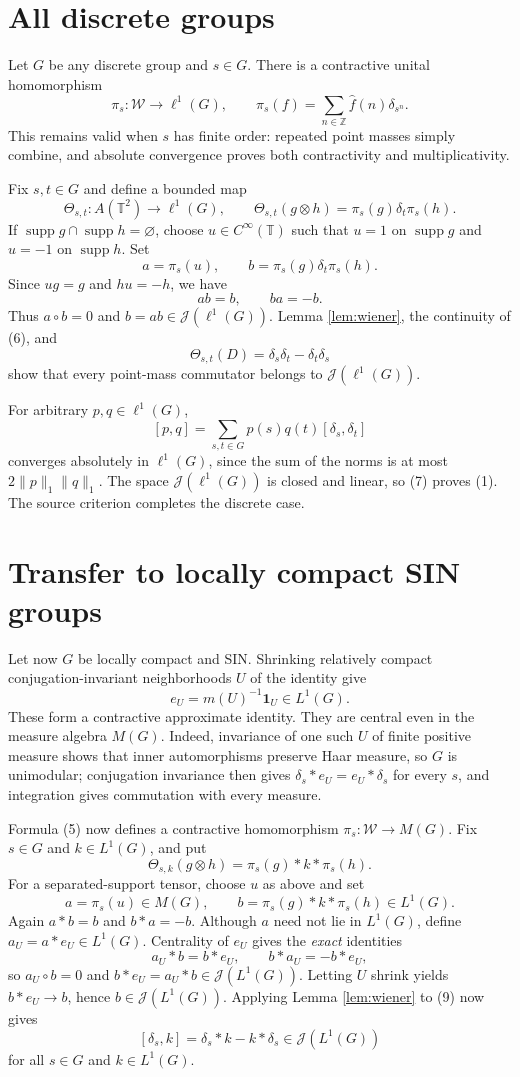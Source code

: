 \documentclass[10pt]{article}
\newcommand{\TT}{\mathbb T}
\newcommand{\W}{\mathcal W}
\newcommand{\JJ}{\mathcal J}
\newcommand{\supp}{\operatorname{supp}}
\begin{document}
\section*{All discrete groups}

Let $G$ be any discrete group and $s\in G$.  There is a contractive unital
homomorphism
\[
 \pi_s:\W\longrightarrow\ell^1(G),\qquad
 \pi_s(f)=\sum_{n\in\mathbb Z}\widehat f(n)\delta_{s^n}.   \tag{5}
\]
This remains valid when $s$ has finite order: repeated point masses simply
combine, and absolute convergence proves both contractivity and
multiplicativity.

Fix $s,t\in G$ and define a bounded map
\[
 \Theta_{s,t}:A(\TT^2)\longrightarrow\ell^1(G),\qquad
 \Theta_{s,t}(g\otimes h)=\pi_s(g)\delta_t\pi_s(h).         \tag{6}
\]
If $\supp g\cap\supp h=\varnothing$, choose $u\in C^\infty(\TT)$ such that
$u=1$ on $\supp g$ and $u=-1$ on $\supp h$.  Set
\[
 a=\pi_s(u),\qquad b=\pi_s(g)\delta_t\pi_s(h).
\]
Since $ug=g$ and $hu=-h$, we have
\[
 ab=b,\qquad ba=-b.
\]
Thus $a\circ b=0$ and $b=ab\in\JJ(\ell^1(G))$.  Lemma
\ref{lem:wiener}, the continuity of (6), and
\[
 \Theta_{s,t}(D)=\delta_s\delta_t-\delta_t\delta_s
\]
show that every point-mass commutator belongs to $\JJ(\ell^1(G))$.

For arbitrary $p,q\in\ell^1(G)$,
\[
 [p,q]=\sum_{s,t\in G}p(s)q(t)[\delta_s,\delta_t]          \tag{7}
\]
converges absolutely in $\ell^1(G)$, since the sum of the norms is at most
$2\|p\|_1\|q\|_1$.  The space $\JJ(\ell^1(G))$ is closed and linear, so
(7) proves (1).  The source criterion completes the discrete case.

\section*{Transfer to locally compact SIN groups}

Let now $G$ be locally compact and SIN.  Shrinking relatively compact
conjugation-invariant neighborhoods $U$ of the identity give
\[
 e_U=m(U)^{-1}\mathbf1_U\in L^1(G).                         \tag{8}
\]
These form a contractive approximate identity.  They are central even in the
measure algebra $M(G)$.  Indeed, invariance of one such $U$ of finite positive
measure shows that inner automorphisms preserve Haar measure, so $G$ is
unimodular; conjugation invariance then gives
$\delta_s*e_U=e_U*\delta_s$ for every $s$, and integration gives commutation
with every measure.

Formula (5) now defines a contractive homomorphism $\pi_s:\W\to M(G)$.
Fix $s\in G$ and $k\in L^1(G)$, and put
\[
 \Theta_{s,k}(g\otimes h)=\pi_s(g)*k*\pi_s(h).             \tag{9}
\]
For a separated-support tensor, choose $u$ as above and set
\[
 a=\pi_s(u)\in M(G),\qquad b=\pi_s(g)*k*\pi_s(h)\in L^1(G).
\]
Again $a*b=b$ and $b*a=-b$.  Although $a$ need not lie in $L^1(G)$, define
$a_U=a*e_U\in L^1(G)$.  Centrality of $e_U$ gives the \emph{exact} identities
\[
 a_U*b=b*e_U,\qquad b*a_U=-b*e_U,
\]
so $a_U\circ b=0$ and $b*e_U=a_U*b\in\JJ(L^1(G))$.  Letting
$U$ shrink yields $b*e_U\to b$, hence $b\in\JJ(L^1(G))$.
Applying Lemma \ref{lem:wiener} to (9) now gives
\[
 [\delta_s,k]=\delta_s*k-k*\delta_s\in\JJ(L^1(G))         \tag{10}
\]
for all $s\in G$ and $k\in L^1(G)$.
\end{document}
